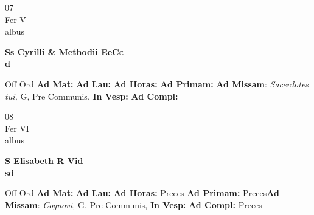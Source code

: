 \documentclass[10pt, openany]{book}
\begin{document}
    \begin{center}
        \begin{minipage}{3.5in}
            \vspace{2em}
            \begin{minipage}{0.5in}
                {\Huge 07} \\
                {\normalsize Fer V} \\
                {\normalsize albus}
            \end{minipage}
            \begin{minipage}{3.0in}
                \textbf{ \large Ss Cyrilli \& Methodii EeCc \\
                \textnormal{\normalsize d}} \\ 
            \end{minipage}
            \begin{justify}Off Ord
                \textbf{Ad Mat: }
                \textbf{Ad Lau: }
                \textbf{Ad Horas: }
                \textbf{Ad Primam: }\textbf{Ad Missam}: \textit{Sacerdotes tui,} G, Pre Communis,  
                \textbf{In Vesp: }
                \textbf{Ad Compl: }
            \end{justify}
        \end{minipage}
    \end{center}

    \begin{center}
        \begin{minipage}{3.5in}
            \vspace{2em}
            \begin{minipage}{0.5in}
                {\Huge 08} \\
                {\normalsize Fer VI} \\
                {\normalsize albus}
            \end{minipage}
            \begin{minipage}{3.0in}
                \textbf{ \large S Elisabeth R Vid \\
                \textnormal{\normalsize sd}} \\ 
            \end{minipage}
            \begin{justify}Off Ord
                \textbf{Ad Mat: }
                \textbf{Ad Lau: }
                \textbf{Ad Horas: }Preces
                \textbf{Ad Primam: }Preces\textbf{Ad Missam}: \textit{Cognovi,} G, Pre Communis,  
                \textbf{In Vesp: }
                \textbf{Ad Compl: }Preces
            \end{justify}
        \end{minipage}
    \end{center}
\end{document}
